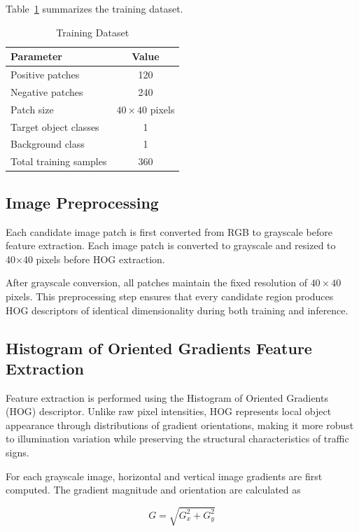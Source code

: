 \documentclass[11pt,a4paper,twoside]{article}
\begin{document}
Table~\ref{tab:dataset} summarizes the training dataset.

\begin{table}[ht]
\centering
\caption{Training Dataset}
\label{tab:dataset}
\begin{tabular}{lc}
\hline
Parameter & Value\\
\hline
Positive patches & 120\\
Negative patches & 240\\
Patch size & $40\times40$ pixels\\
Target object classes & 1\\
Background class & 1\\
Total training samples & 360\\
\hline
\end{tabular}
\end{table}
\subsection{Image Preprocessing}

Each candidate image patch is first converted from RGB to grayscale before feature extraction. Each image patch is converted to grayscale and resized to 40×40 pixels before HOG extraction.

After grayscale conversion, all patches maintain the fixed resolution of $40\times40$ pixels. This preprocessing step ensures that every candidate region produces HOG descriptors of identical dimensionality during both training and inference.

\subsection{Histogram of Oriented Gradients Feature Extraction}

Feature extraction is performed using the Histogram of Oriented Gradients (HOG) descriptor. Unlike raw pixel intensities, HOG represents local object appearance through distributions of gradient orientations, making it more robust to illumination variation while preserving the structural characteristics of traffic signs.

For each grayscale image, horizontal and vertical image gradients are first computed. The gradient magnitude and orientation are calculated as

\begin{equation}
G=\sqrt{G_x^2+G_y^2}
\end{equation}
\end{document}
